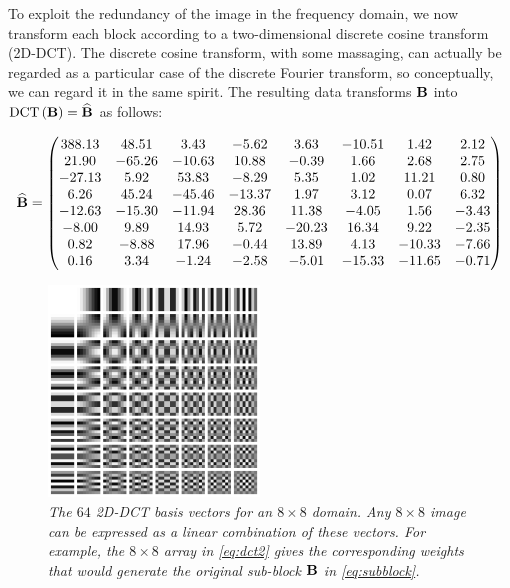 To exploit the redundancy of the image in the frequency domain, we now transform each block according to a two-dimensional discrete cosine transform (2D-DCT). The discrete cosine transform, with some massaging, can actually be regarded as a particular case of the discrete Fourier transform, so conceptually, we can regard it in the same spirit. The resulting data transforms $\mathbf{B}$ into $\textnormal{DCT}\left(\mathbf{B}\right) = \widehat{\mathbf{B}}$ as follows:

\begin{equation}
	\widehat{\mathbf{B}} = \begin{pmatrix}
	388.13   &   48.51   &   3.43   &   -5.62   &   3.63   &   -10.51   &   1.42   &   2.12\\
	21.90     &	 -65.26   & -10.63  &  10.88   &   -0.39  &	1.66     & 	2.68	  &   2.75\\
	-27.13    &   5.92     &   53.83 &   -8.29   &	 5.35   &	1.02	    & 11.21   &   0.80\\
	6.26	      &   45.24   & -45.46  & -13.37  &	 1.97   &	3.12     &	0.07    &   6.32\\
	-12.63    &	-15.30    & -11.94  &	28.36   &	11.38  &	-4.05    & 1.56	   &  -3.43\\
	-8.00	      &   9.89     &   14.93  &  5.72     &	-20.23 &   16.34   &  9.22     &   -2.35\\
	0.82	      &   -8.88    &   17.96  &	-0.44    &  13.89   &    4.13	    & -10.33   & -7.66\\
	0.16	      &   3.34     &   -1.24   & 	-2.58    & 	-5.01	   &   -15.33  & -11.65   &  -0.71	
	\end{pmatrix}
\label{eq:dct2}
\end{equation}

\begin{figure}
\label{fig:jpeg8}
	\centering
	\includegraphics[width=0.5\textwidth]{chap4/figures/jpeg8.png}
	\caption{\em The $64$ 2D-DCT basis vectors for an $8 \times 8$ domain. Any $8 \times 8$ image can be expressed as a linear combination of these vectors. For example, the $8 \times 8$ array in \ref{eq:dct2} gives the corresponding weights that would generate the original sub-block $\mathbf{B}$ in \ref{eq:subblock}.}
\end{figure}

